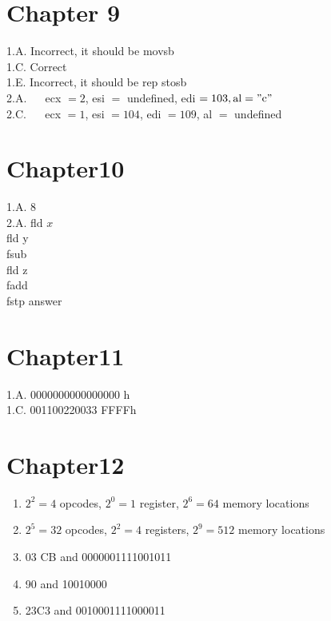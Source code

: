 \documentclass[10pt]{article}
\begin{document}
\section*{Chapter 9}
1.A. Incorrect, it should be movsb\\
1.C. Correct\\
1.E. Incorrect, it should be rep stosb\\
2.A. $\quad$ ecx $=2$, esi $=$ undefined, edi $=103, \mathrm{al}=" \mathrm{c} "$\\
2.C. $\quad$ ecx $=1$, esi $=104$, edi $=109$, al $=$ undefined

\section*{Chapter10}
1.A. 8\\
2.A. fld $x$\\
fld y\\
fsub\\
fld z\\
fadd\\
fstp answer

\section*{Chapter11}
1.A. 0000000000000000 h\\
1.C. 001100220033 FFFFh

\section*{Chapter12}
\begin{enumerate}
  \item $2^{2}=4$ opcodes, $2^{0}=1$ register, $2^{6}=64$ memory locations
  \item $2^{5}=32$ opcodes, $2^{2}=4$ registers, $2^{9}=512$ memory locations
  \item 03 CB and 0000001111001011
  \item 90 and 10010000
  \item 23C3 and 0010001111000011
\end{enumerate}
\end{document}
